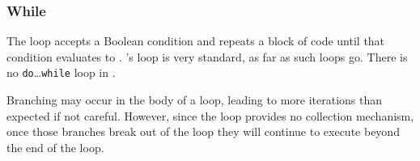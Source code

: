 \subsubsection{While}

The  loop accepts a Boolean condition and repeats a block of code
until that condition evaluates to . \Trilogy{}'s  loop is
very standard, as far as such loops go. There is no \texttt{do}\dots\texttt{while}
loop in \Trilogy{}.

\begin{bnf*}
\end{bnf*}

Branching may occur in the body of a  loop, leading to more iterations
than expected if not careful. However, since the  loop provides no collection
mechanism, once those branches break out of the loop they will continue to execute
beyond the end of the loop.

\begin{prooftree}
\end{prooftree}

\begin{prooftree}
\end{prooftree}
